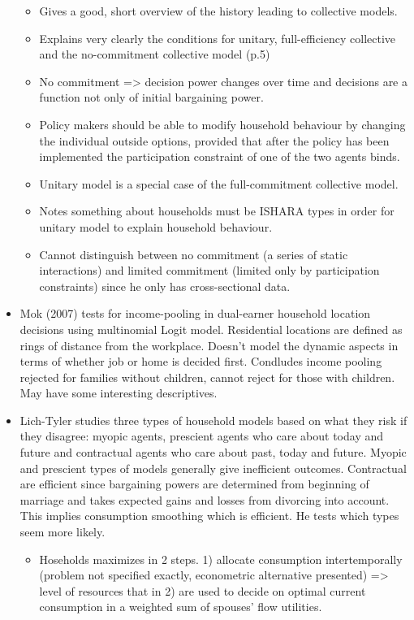 \begin{itemize}
\begin{itemize}
\item Gives a good, short overview of the history leading to collective models.
\item Explains very clearly the conditions for unitary, full-efficiency collective and the no-commitment collective model (p.5)
\item No commitment => decision power changes over time and decisions are a function not only of initial bargaining power.
\item Policy makers should be able to modify household behaviour by changing the individual outside options, provided that after the policy has been implemented the participation constraint of one of the two agents binds.
\item Unitary model is a special case of the full-commitment collective model.
\item Notes something about households must be ISHARA types in order for unitary model to explain household behaviour.
\item Cannot distinguish between no commitment (a series of static interactions) and limited commitment (limited only by participation constraints) since he only has cross-sectional data.
\end{itemize}
\item Mok (2007) tests for income-pooling in dual-earner household location decisions using  multinomial Logit model. Residential locations are defined as rings of distance from the workplace. Doesn't model the dynamic aspects in terms of whether job or home is decided first. Condludes income pooling rejected for families without children, cannot reject for those with children. May have some interesting descriptives.
\item Lich-Tyler studies three types of household models based on what they risk if they disagree: myopic agents, prescient agents who care about today and future and contractual agents who care about past, today and future. Myopic and prescient types of models generally give inefficient outcomes. Contractual are efficient since bargaining powers are determined from beginning of marriage and takes expected gains and losses from divorcing into account. This implies consumption smoothing which is efficient. He tests which types seem more likely. 
\begin{itemize}
\item Hoseholds maximizes in 2 steps. 1) allocate consumption intertemporally (problem not specified exactly, econometric alternative presented) => level of resources that in 2) are used to decide on optimal current consumption in a weighted sum of spouses' flow utilities.

\end{itemize}
\end{itemize}
